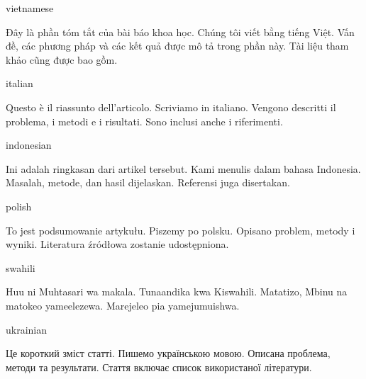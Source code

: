 \documentclass[colorlinks,nofoot,spanish,japanese,russian,greek,ukrainian,vietnamese,french,portuguese,turkish,polish,indonesian,italian,german,latin,serbianc,bidi=basic]{asmeconf}
\begin{document}
{\NotoSerif
\begin{selectlanguage}{vietnamese}
\begin{abstract*}
Đây là phần tóm tắt của bài báo khoa học. Chúng tôi viết bằng tiếng Việt. Vấn đề, các phương pháp và các kết quả được mô tả trong phần này. Tài liệu tham khảo cũng được bao gồm.%
\end{abstract*}
\end{selectlanguage}%

\begin{selectlanguage}{italian}
\begin{abstract*}
Questo è il riassunto dell'articolo. Scriviamo in italiano. Vengono descritti il ​​problema, i metodi e i risultati. Sono inclusi anche i riferimenti.
\end{abstract*}
\end{selectlanguage}%

\begin{selectlanguage}{indonesian}
\begin{abstract*}
Ini adalah ringkasan dari artikel tersebut. Kami menulis dalam bahasa Indonesia. Masalah, metode, dan hasil dijelaskan. Referensi juga disertakan.
\end{abstract*}
\end{selectlanguage}%

\begin{selectlanguage}{polish}
\begin{abstract*}
To jest podsumowanie artykułu. Piszemy po polsku. Opisano problem, metody i wyniki. Literatura źródłowa zostanie udostępniona.
\end{abstract*}
\end{selectlanguage}%

\begin{selectlanguage}{swahili}
\begin{abstract*}
Huu ni Muhtasari wa makala. Tunaandika kwa Kiswahili.
Matatizo, Mbinu na matokeo yameelezewa. Marejeleo pia yamejumuishwa.
\end{abstract*}
\end{selectlanguage}%
}%

\begin{selectlanguage}{ukrainian}
\begin{abstract*}
Це короткий зміст статті. Пишемо українською мовою. Описана проблема, методи та результати. Стаття включає список використаної літератури.
\end{abstract*}
\end{selectlanguage}%
\end{document}
